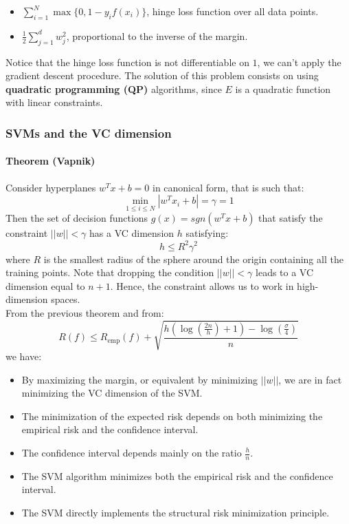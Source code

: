 \begin{itemize}
	\item $\sum\limits_{i=1}^N\max\{0,1-y_if(x_i)\}$, hinge loss function over all data points.
	\item $\frac{1}{2}\sum\limits_{j = 1}^dw_j^2$, proportional to the inverse of the margin.
\end{itemize}
Notice that the hinge loss function is not differentiable on $1$, we can't apply the gradient descent procedure. The solution of this problem consists on using \textbf{quadratic programming (QP)} algorithms, since $E$ is a quadratic function with linear constraints.


\subsubsection{SVMs and the VC dimension}
\paragraph{Theorem (Vapnik)} Consider hyperplanes $w^Tx+b= 0$ in canonical form, that is such that:
$$\min\limits_{1\leq i \leq N}|w^Tx_i+b| = \gamma = 1$$
Then the set of decision functions $g(x) = sgn(w^Tx+b)$ that satisfy the constraint $||w|| < \gamma$ has a VC dimension $h$ satisfying:
$$h \leq R^2\gamma^2$$
where $R$ is the smallest radius of the sphere around the origin containing all the training points. Note that dropping the condition $||w|| < \gamma$ leads to a VC dimension equal to $n+1$. Hence, the constraint allows us to work in high-dimension spaces. \\
From the previous theorem and from:
$$R(f) \leq R_{\text{emp}}(f) + \sqrt{\frac{h(\log(\frac{2n}{h})+1)-\log(\frac{\sigma}{4})}{n}}$$
we have:
\begin{itemize}
	\item By maximizing the margin, or equivalent by minimizing $||w||$, we are in fact minimizing the VC dimension of the SVM.
	\item The minimization of the expected risk depends on both minimizing the empirical risk and the confidence interval.
	\item The confidence interval depends mainly on the ratio $\frac{h}{n}$.
	\item The SVM algorithm minimizes both the empirical risk and the confidence interval.
	\item The SVM directly implements the structural risk minimization principle.
\end{itemize}

